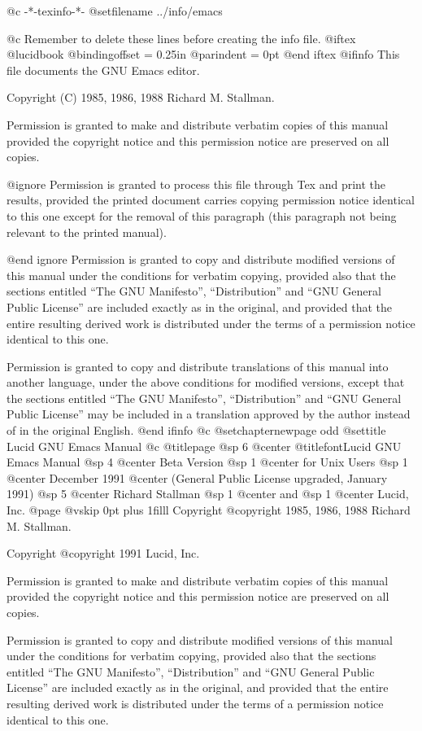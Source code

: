   @c -*-texinfo-*-
@setfilename ../info/emacs

@c Remember to delete these lines before creating the info file.
@iftex
@lucidbook
@bindingoffset = 0.25in
@parindent = 0pt
@end iftex
@ifinfo
This file documents the GNU Emacs editor.

Copyright (C) 1985, 1986, 1988 Richard M. Stallman.

Permission is granted to make and distribute verbatim copies of
this manual provided the copyright notice and this permission notice
are preserved on all copies.

@ignore
Permission is granted to process this file through Tex and print the
results, provided the printed document carries copying permission
notice identical to this one except for the removal of this paragraph
(this paragraph not being relevant to the printed manual).

@end ignore
Permission is granted to copy and distribute modified versions of this
manual under the conditions for verbatim copying, provided also that the
sections entitled ``The GNU Manifesto'', ``Distribution'' and ``GNU
General Public License'' are included exactly as in the original, and
provided that the entire resulting derived work is distributed under the
terms of a permission notice identical to this one.

Permission is granted to copy and distribute translations of this manual
into another language, under the above conditions for modified versions,
except that the sections entitled ``The GNU Manifesto'',
``Distribution'' and ``GNU General Public License'' may be included in a
translation approved by the author instead of in the original English.
@end ifinfo
@c
@setchapternewpage odd
@settitle Lucid GNU Emacs Manual
@c
@titlepage
@sp 6
@center @titlefont{Lucid GNU Emacs Manual}
@sp 4
@center Beta Version 
@sp 1
@center for Unix Users
@sp 1
@center December 1991
@center (General Public License upgraded, January 1991)
@sp 5
@center Richard Stallman
@sp 1
@center and
@sp 1
@center Lucid, Inc.
@page
@vskip 0pt plus 1filll
Copyright @copyright{} 1985, 1986, 1988 Richard M. Stallman.

Copyright @copyright{} 1991 Lucid, Inc.

Permission is granted to make and distribute verbatim copies of
this manual provided the copyright notice and this permission notice
are preserved on all copies.

Permission is granted to copy and distribute modified versions of this
manual under the conditions for verbatim copying, provided also that the
sections entitled ``The GNU Manifesto'', ``Distribution'' and ``GNU
General Public License'' are included exactly as in the original, and
provided that the entire resulting derived work is distributed under the
terms of a permission notice identical to this one.

